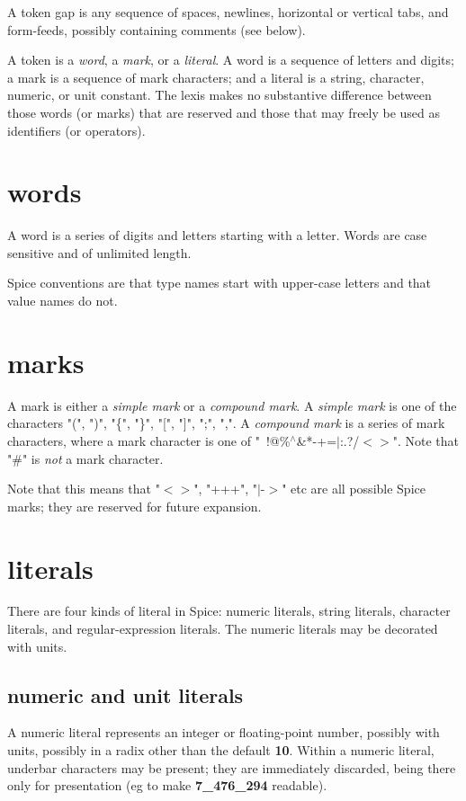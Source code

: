 \documentclass{report}
\begin{document}
A token gap is any sequence of spaces, newlines, horizontal or
vertical tabs, and form-feeds, possibly containing comments (see below).

A token is a {\em word}, a {\em mark}, or a {\em literal}. A word is a sequence of
letters and digits; a mark is a sequence of mark characters; and a
literal is a string, character, numeric, or unit constant. The lexis
makes no substantive difference between those words (or marks) that
are reserved and those that may freely be used as identifiers (or
operators).

\section{words}


A word is a series of digits and letters starting with a letter. Words are
case sensitive and of unlimited length.

Spice conventions are that type names start with upper-case letters
and that value names do not.

\section{marks}


A mark is either a {\em simple mark} or a {\em compound mark}. A {\em simple mark}
is one of the characters "(", ")", "\{", "\}", "{[}", "{]}", ";", ",". A
{\em compound mark} is a series of mark characters, where a mark character
is one of "~!@\%$^\wedge$\&*-+=$\mid$:.?/$<$$>$". Note that "\#" is {\em not} a mark
character.

Note that this means that "$<$$>$", "+++", "$\mid$-$>$" etc are all possible Spice
marks; they are reserved for future expansion.

\section{literals}


There are four kinds of literal in Spice: numeric literals, string literals,
character literals, and regular-expression literals. The
numeric literals may be decorated with units.

\subsection{numeric and unit literals}


A numeric literal represents an integer or floating-point number, possibly
with units, possibly in a radix other than the default {\bf 10}. Within a numeric
literal, underbar characters may be present; they are immediately discarded,
being there only for presentation (eg to make {\bf 7\_476\_294} readable).
\end{document}
